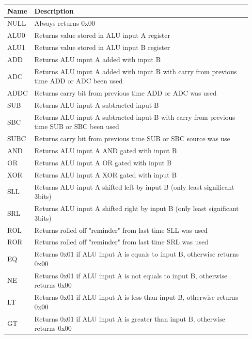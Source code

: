 \documentclass[a4paper,12pt]{article}
\begin{document}
\begin{longtable}[h!]{| l | p{} | }	
	\hline 
	\rowcolor[rgb]{0.82,0.82,0.82}
	Name & Description \\\hline
	\endhead		
	
	\endfoot
	
	NULL & Always returns 0x00\\\hline
	ALU0 & Returns value stored in ALU input A register\\\hline
	ALU1 & Returns value stored in ALU input B register\\\hline
	ADD  & Returns ALU input A added with input B\\\hline
	ADC  & Returns ALU input A added with input B with carry from previous time ADD or ADC been used\\\hline
	ADDC & Returns carry bit from previous time ADD or ADC was used\\\hline
	SUB  & Returns ALU input A subtracted input B\\\hline
	SBC  & Returns ALU input A subtracted input B with carry from previous time SUB or SBC been used\\\hline
	SUBC & Returns carry bit from previous time SUB or SBC source was use\\\hline
	AND  & Returns ALU input A AND gated with input B\\\hline
	OR   & Returns ALU input A OR gated with input B\\\hline
	XOR  & Returns ALU input A XOR gated with input B\\\hline
	SLL  & Returns ALU input A shifted left by input B (only least significant 3bits)\\\hline
	SRL  & Returns ALU input A shifted right by input B (only least significant 3bits)\\\hline
	ROL  & Returns rolled off "reminder" from last time SLL was used\\\hline
	ROR  & Returns rolled off "reminder" from last time SRL was used\\\hline
	EQ   & Returns 0x01 if ALU input A is equals to input B, otherwise returns 0x00\\\hline
	NE   & Returns 0x01 if ALU input A is not equals to input B, otherwise returns 0x00\\\hline
	LT   & Returns 0x01 if ALU input A is less than input B, otherwise returns 0x00\\\hline
	GT   & Returns 0x01 if ALU input A is greater than input B, otherwise returns 0x00\\\hline

\end{longtable}
\end{document}
